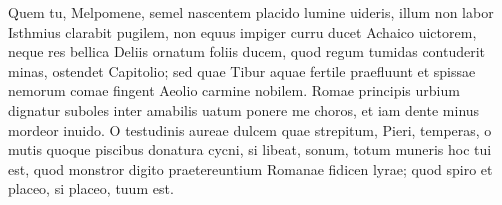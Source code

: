 \documentclass{book}
\newenvironment {carmen} [1] [\relax] 
  {\Titulus \Versus \incipit*\numerus{1}#1}
  {\endVersus}
\newcommand {\GlycAscl}  {\Forma \strophae {2 \poena 0}}
\begin{document}
\begin{carmen}[\GlycAscl]

     Quem tu, Melpomene, semel
 nascentem placido lumine uideris,
      illum non labor Isthmius
 clarabit pugilem, non equus impiger
      curru ducet Achaico               
 uictorem, neque res bellica Deliis
      ornatum foliis ducem,
 quod regum tumidas contuderit minas,
      ostendet Capitolio;
 sed quae Tibur aquae fertile praefluunt               
      et spissae nemorum comae
 fingent Aeolio carmine nobilem.
      Romae principis urbium
 dignatur suboles inter amabilis
      uatum ponere me choros,               
 et iam dente minus mordeor inuido.
      O testudinis aureae
 dulcem quae strepitum, Pieri, temperas,
      o mutis quoque piscibus
 donatura cycni, si libeat, sonum,               
      totum muneris hoc tui est,
 quod monstror digito praetereuntium
      Romanae fidicen lyrae;
 quod spiro et placeo, si placeo, tuum est.
 

\end{carmen}
\end{document}
